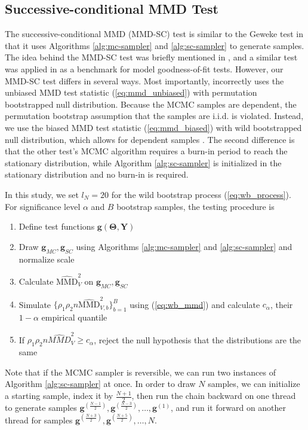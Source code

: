 \documentclass[a4paper,11pt]{article}
\begin{document}
\subsection{Successive-conditional MMD Test}
The successive-conditional MMD (MMD-SC) test is similar to the Geweke test in that it uses Algorithms \ref{alg:mc-sampler} and \ref{alg:sc-sampler} to generate samples. The idea behind the MMD-SC test was briefly mentioned in \cite{lloyd_statistical_2015}, and a similar test was applied in \cite{liu_kernelized_2016} as a benchmark for model goodness-of-fit tests. However, our MMD-SC test differs in several ways. Most importantly, \cite{liu_kernelized_2016} incorrectly uses the unbiased MMD test statistic (\ref{eq:mmd_unbiased}) with permutation bootstrapped null distribution. Because the MCMC samples are dependent, the permutation bootstrap assumption that the samples are i.i.d. is violated. Instead, we use the biased MMD test statistic (\ref{eq:mmd_biased}) with wild bootstrapped null distribution, which allows for dependent samples \cite{chwialkowski_wild_2016}. The second difference is that the other test's MCMC algorithm requires a burn-in period to reach the stationary distribution, while Algorithm \ref{alg:sc-sampler} is initialized in the stationary distribution and no burn-in is required.

In this study, we set $l_N=20$ for the wild bootstrap process (\ref{eq:wb_process}). For significance level $\alpha$ and $B$ bootstrap samples, the testing procedure is
\begin{enumerate}
    \item Define test functions $\mathbf{g}(\mathbf{\Theta}, \mathbf{Y})$
    \item Draw $\mathbf{g}_{MC}, \mathbf{g}_{SC}$ using Algorithms \ref{alg:mc-sampler} and \ref{alg:sc-sampler} and normalize scale
    \item Calculate $\widehat{\mathrm{MMD}}_{V}^{2}$ on $\mathbf{g}_{MC}, \mathbf{g}_{SC}$
    \item Simulate $\{\rho_{1} \rho_{2} n \widehat{\mathrm{MMD}}^{2}_{V, b}\}_{b=1}^{B}$ using (\ref{eq:wb_mmd}) and calculate $c_{\alpha}$, their $1-\alpha$ empirical quantile
    \item If $\rho_{1} \rho_{2} n \widehat{MMD}^{2}_{V} \geq c_{\alpha}$, reject the null hypothesis that the distributions are the same
\end{enumerate}

Note that if the MCMC sampler is reversible, we can run two instances of Algorithm \ref{alg:sc-sampler} at once. In order to draw $N$ samples, we can initialize a starting sample, index it by $\frac{N+1}{2}$, then run the chain backward on one thread to generate samples $\mathbf{g}^{(\frac{N-1}{2})}, \mathbf{g}^{(\frac{N-3}{2})}, \ldots, \mathbf{g}^{(1)}$, and run it forward on another thread for samples $\mathbf{g}^{(\frac{N+3}{2})}, \mathbf{g}^{(\frac{N+5}{2})}, \ldots, N$.
\end{document}

